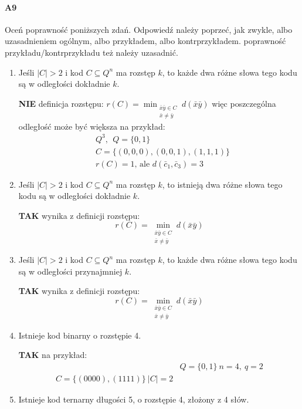 \documentclass[a4paper,12pt]{article}
\theoremstyle{definition}%
\theoremstyle{definition}
\theoremstyle{problem}
\begin{document}
\paragraph{A9} Oceń poprawność poniższych zdań. Odpowiedź należy poprzeć, jak zwykle, albo uzasadnieniem ogólnym, albo przykładem, albo kontrprzykładem. poprawność przykładu/kontrprzykładu też należy uzasadnić.
\begin{enumerate}[label=\alph*)]
\item Jeśli $|C| > 2$ i kod $C \subseteq Q^n$ ma rozstęp $k$, to każde dwa różne słowa tego kodu są w odległości dokładnie $k$.

\textbf{NIE} definicja rozstępu: $r(C)=\min _{\begin{matrix}
\bar{x}\bar{y}\in C\\
\bar{x}\neq\bar{y}
\end{matrix}}d(\bar{x}\bar{y})$ więc poszczególna odległość może być większa na przykład:
\begin{align*}
&Q^3,\ \ Q=\{0,1\}\\
&C=\{(0,0,0),(0,0,1),(1,1,1)\}\\
&r(C)=1\text{, ale }d(\bar{c}_1,\bar{c}_3)=3
\end{align*}
\item Jeśli $|C| > 2$ i kod $C \subseteq Q^n$ ma rozstęp $k$, to istnieją dwa różne słowa tego kodu są w odległości dokładnie $k$.

\textbf{TAK} wynika z definicji rozstępu:
$$r(C)=\min _{\begin{matrix}
\bar{x}\bar{y}\in C\\
\bar{x}\neq\bar{y}
\end{matrix}}d(\bar{x}\bar{y})$$
\item Jeśli $|C| > 2$ i kod $C \subseteq Q^n$ ma rozstęp $k$, to każde dwa różne słowa tego kodu są w odległości przynajmniej $k$.

\textbf{TAK} wynika z definicji rozstępu:
$$r(C)=\min _{\begin{matrix}
\bar{x}\bar{y}\in C\\
\bar{x}\neq\bar{y}
\end{matrix}}d(\bar{x}\bar{y})$$
\item Istnieje kod binarny o rozstępie 4.

\textbf{TAK} na przykład:
\begin{align}
&Q=\{0,1\}\ n=4,\ q=2\\
C=\{(0000),(1111)\}\ |C|=2
\end{align}
\item Istnieje kod ternarny długości 5, o rozstępie 4, złożony z 4 słów.


\end{enumerate}
\end{document}
